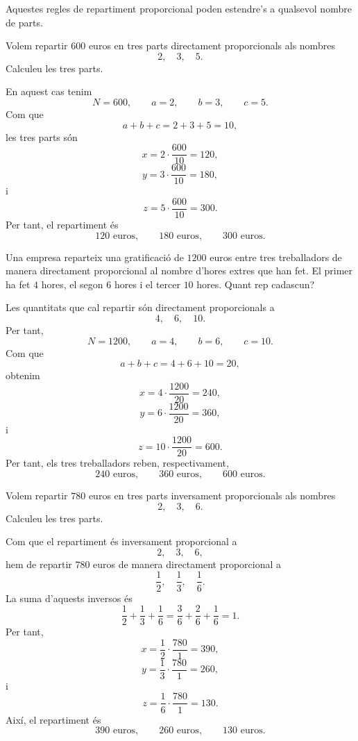 Aquestes regles de repartiment proporcional poden estendre’s a qualsevol nombre de parts.

\begin{exemple}
Volem repartir \(600\) euros en tres parts directament proporcionals als nombres
\[
	2,\quad 3,\quad 5.
\]
Calculeu les tres parts.
\end{exemple}

\begin{solucio}
En aquest cas tenim
\[
	N=600,\qquad a=2,\qquad b=3,\qquad c=5.
\]
Com que
\[
	a+b+c=2+3+5=10,
\]
les tres parts són
\[
	x=2\cdot\frac{600}{10}=120,
\]
\[
	y=3\cdot\frac{600}{10}=180,
\]
i
\[
	z=5\cdot\frac{600}{10}=300.
\]
Per tant, el repartiment és
\[
	120\text{ euros},\qquad 180\text{ euros},\qquad 300\text{ euros}.
\]
\end{solucio}

\begin{exemple}
Una empresa reparteix una gratificació de \(1200\) euros entre tres treballadors de manera directament proporcional al nombre d'hores extres que han fet. El primer ha fet \(4\) hores, el segon \(6\) hores i el tercer \(10\) hores. Quant rep cadascun?
\end{exemple}

\begin{solucio}
Les quantitats que cal repartir són directament proporcionals a
\[
	4,\quad 6,\quad 10.
\]
Per tant,
\[
	N=1200,\qquad a=4,\qquad b=6,\qquad c=10.
\]
Com que
\[
	a+b+c=4+6+10=20,
\]
obtenim
\[
	x=4\cdot\frac{1200}{20}=240,
\]
\[
	y=6\cdot\frac{1200}{20}=360,
\]
i
\[
	z=10\cdot\frac{1200}{20}=600.
\]
Per tant, els tres treballadors reben, respectivament,
\[
	240\text{ euros},\qquad 360\text{ euros},\qquad 600\text{ euros}.
\]
\end{solucio}

\begin{exemple}
Volem repartir \(780\) euros en tres parts inversament proporcionals als nombres
\[
	2,\quad 3,\quad 6.
\]
Calculeu les tres parts.
\end{exemple}

\begin{solucio}
Com que el repartiment és inversament proporcional a
\[
	2,\quad 3,\quad 6,
\]
hem de repartir \(780\) euros de manera directament proporcional a
\[
	\frac{1}{2},\quad \frac{1}{3},\quad \frac{1}{6}.
\]
La suma d'aquests inversos és
\[
	\frac{1}{2}+\frac{1}{3}+\frac{1}{6}
	=
	\frac{3}{6}+\frac{2}{6}+\frac{1}{6}
	=
	1.
\]
Per tant,
\[
	x=\frac{1}{2}\cdot\frac{780}{1}=390,
\]
\[
	y=\frac{1}{3}\cdot\frac{780}{1}=260,
\]
i
\[
	z=\frac{1}{6}\cdot\frac{780}{1}=130.
\]
Així, el repartiment és
\[
	390\text{ euros},\qquad 260\text{ euros},\qquad 130\text{ euros}.
\]
\end{solucio}

